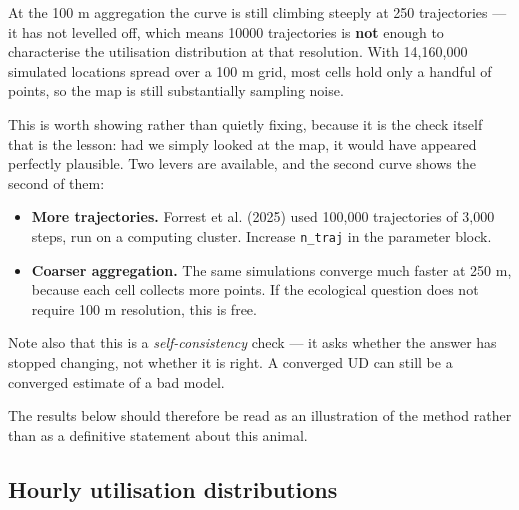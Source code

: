\documentclass[
  letterpaper,
  DIV=11,
  numbers=noendperiod]{scrartcl}
\providecommand{\tightlist}{%
  \setlength{\itemsep}{0pt}\setlength{\parskip}{0pt}}
\begin{document}
\begin{tcolorbox}[enhanced jigsaw, arc=.35mm, bottomrule=.15mm, bottomtitle=1mm, breakable, colback=white, colbacktitle=quarto-callout-important-color!10!white, colframe=quarto-callout-important-color-frame, coltitle=black, left=2mm, leftrule=.75mm, opacityback=0, opacitybacktitle=0.6, rightrule=.15mm, title=\textcolor{quarto-callout-important-color}{\faExclamation}\hspace{0.5em}{This simulation has \emph{not} converged}, titlerule=0mm, toprule=.15mm, toptitle=1mm]

At the 100 m aggregation the curve is still climbing steeply at 250
trajectories --- it has not levelled off, which means 10000 trajectories
is \textbf{not} enough to characterise the utilisation distribution at
that resolution. With 14,160,000 simulated locations spread over a 100 m
grid, most cells hold only a handful of points, so the map is still
substantially sampling noise.

This is worth showing rather than quietly fixing, because it is the
check itself that is the lesson: had we simply looked at the map, it
would have appeared perfectly plausible. Two levers are available, and
the second curve shows the second of them:

\begin{itemize}
\tightlist
\item
  \textbf{More trajectories.} Forrest et al. (2025) used 100,000
  trajectories of 3,000 steps, run on a computing cluster. Increase
  \texttt{n\_traj} in the parameter block.
\item
  \textbf{Coarser aggregation.} The same simulations converge much
  faster at 250 m, because each cell collects more points. If the
  ecological question does not require 100 m resolution, this is free.
\end{itemize}

Note also that this is a \emph{self-consistency} check --- it asks
whether the answer has stopped changing, not whether it is right. A
converged UD can still be a converged estimate of a bad model.

\end{tcolorbox}

The results below should therefore be read as an illustration of the
method rather than as a definitive statement about this animal.

\subsection{Hourly utilisation
distributions}\label{hourly-utilisation-distributions}
\end{document}
